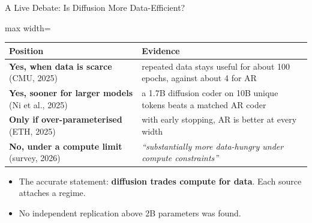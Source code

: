 \begin{frame}{A Live Debate: Is Diffusion More Data-Efficient?}
    \begin{center}
    \small
    \renewcommand{\arraystretch}{1.2}
    \begin{adjustbox}{max width=\linewidth}\begin{tabular}{>{\raggedright\arraybackslash}p{4.3cm}>{\raggedright\arraybackslash}p{8.9cm}}
        \toprule
        \textbf{Position} & \textbf{Evidence} \\
        \midrule
        \textbf{Yes, when data is scarce} (CMU, 2025) & repeated data stays useful for about 100 epochs, against about 4 for AR \\
        \textbf{Yes, sooner for larger models} (Ni et al., 2025) & a 1.7B diffusion coder on 10B unique tokens beats a matched AR coder \\
        \textbf{Only if over-parameterised} (ETH, 2025) & with early stopping, AR is better at every width \\
        \textbf{No, under a compute limit} (survey, 2026) & \emph{``substantially more data-hungry under compute constraints''} \\
        \bottomrule
    \end{tabular}\end{adjustbox}
    \end{center}
    \begin{itemize}\itemsep0.4em

        \item The accurate statement: \textbf{diffusion trades compute for data}. Each source attaches a regime.
        \item No independent replication above 2B parameters was found.
    \end{itemize}
\end{frame}

